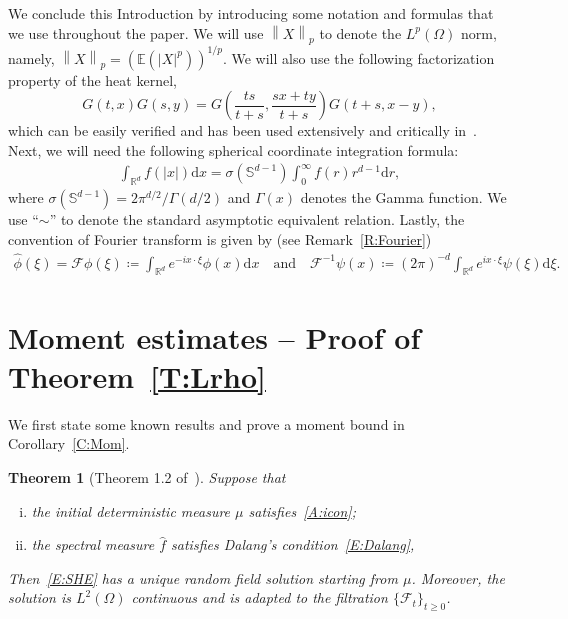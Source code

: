 \documentclass[sn-mathphys]{sn-jnl}%
\newcommand{\BR}{\mathbb{R}}
\newcommand{\Norm}[1]{\left\| #1 \right\|}
\newcommand{\ud}{\ensuremath{\mathrm{d}}}
\numberwithin{equation}{section}
\theoremstyle{thmstyleone}%
\newtheorem{theorem}{Theorem}[section]%
\theoremstyle{thmstyletwo}%
\theoremstyle{thmstylethree}%
\begin{document}
\bigskip

We conclude this Introduction by introducing some notation and formulas that we use throughout the
paper. We will use $\Norm{X}_p$ to denote the $L^p (\Omega)$ norm, namely,
$\Norm{X}_p = \left(\mathbb{E}(\lvert X \rvert^p)\right)^{1/p}$. We will also use the following factorization
property of the heat kernel,
\begin{equation}\label{E:gsim}
  G(t,x)G(s,y) = G\left(\frac{ts}{t+s}, \frac{sx + ty}{t+s}\right)G\left(t+s, x-y\right),
\end{equation}
which can be easily verified and has been used extensively and critically
in~\cite{chen.dalang:15:moments*1,chen.kim:19:nonlinear,chen.huang:19:comparison}. Next, we will
need the following spherical coordinate integration formula:
\begin{align*}
  \int_{\BR^d} f(\lvert x \rvert) \ud x = \sigma(\mathbb{S}^{d-1}) \int_0^\infty f(r) r^{d-1} \ud r,
\end{align*}
where $\sigma(\mathbb{S}^{d-1}) = 2\pi^{d/2} / \Gamma(d/2)$ and $\Gamma(x)$ denotes the Gamma
function. We use ``$\sim$'' to denote the standard asymptotic equivalent relation. Lastly, the
convention of Fourier transform is given by (see Remark~\ref{R:Fourier})
\begin{align}\label{E:Fourier}
  \widehat{\phi}(\xi) = \mathcal{F}\phi(\xi) \coloneqq \int_{\BR^d} e^{-i x\cdot\xi} \phi(x)\ud x \quad \text{and} \quad
  \mathcal{F}^{-1}\psi(x) \coloneqq (2\pi)^{-d} \int_{\BR^d} e^{i x\cdot\xi} \psi(\xi)\ud \xi.
\end{align}



\section{Moment estimates -- Proof of Theorem~\ref{T:Lrho}}\label{S:Lrho}
We first state some known results and prove a moment bound in Corollary~\ref{C:Mom}.

\begin{theorem}[Theorem 1.2 of~\cite{chen.huang:19:comparison}]\label{T:Solve}
  Suppose that
  \begin{enumerate}[(i)]
   \item the initial deterministic measure $\mu$ satisfies~\eqref{A:icon};
   \item the spectral measure $\widehat{f}$ satisfies \textit{Dalang's condition}~\eqref{E:Dalang},
  \end{enumerate}
  Then~\eqref{E:SHE} has a unique random field solution starting from $\mu$. Moreover, the solution
  is $L^2 (\Omega)$ continuous and is adapted to the filtration $\{\mathcal{F}_t\}_{t\ge 0}$.
\end{theorem}
\end{document}

